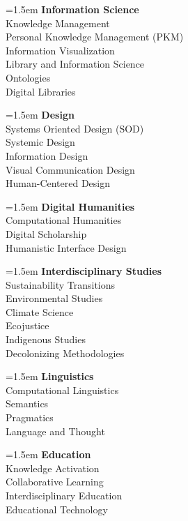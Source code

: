 \begin{multicols}{2}
\noindent\hangindent=1.5em \textbf{Information Science} \\
Knowledge Management \\
Personal Knowledge Management (PKM) \\
Information Visualization \\
Library and Information Science \\
Ontologies \\
Digital Libraries \\
\vspace{4mm}

\noindent\hangindent=1.5em \textbf{Design} \\
Systems Oriented Design (SOD) \\
Systemic Design \\
Information Design \\
Visual Communication Design \\
Human-Centered Design \\
\vspace{4mm}

\noindent\hangindent=1.5em \textbf{Digital Humanities} \\
Computational Humanities \\
Digital Scholarship \\
Humanistic Interface Design \\
\vspace{4mm}

\noindent\hangindent=1.5em \textbf{Interdisciplinary Studies} \\
Sustainability Transitions \\
Environmental Studies \\
Climate Science \\
Ecojustice \\
Indigenous Studies \\
Decolonizing Methodologies \\
\vspace{4mm}

\noindent\hangindent=1.5em \textbf{Linguistics} \\
Computational Linguistics \\
Semantics \\
Pragmatics \\
Language and Thought \\
\vspace{4mm}

\noindent\hangindent=1.5em \textbf{Education} \\
Knowledge Activation \\
Collaborative Learning \\
\RaggedRight Interdisciplinary Education \\
Educational Technology \\
\vspace{4mm}


\end{multicols}
